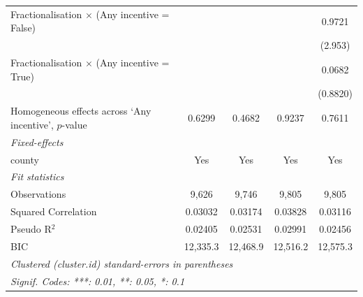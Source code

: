\documentclass[
]{article}
\begin{document}
\begin{landscape}
\begin{table}
\begin{tabular}{lcccc}
   Fractionalisation $\times$ (Any incentive = False)                                       &          &          &                & 0.9721\\   
                                                                                            &          &          &                & (2.953)\\   
   Fractionalisation $\times$ (Any incentive = True)                                        &          &          &                & 0.0682\\   
                                                                                            &          &          &                & (0.8820)\\   
   Homogeneous effects across `Any incentive', $p$-value                                    & 0.6299   & 0.4682   & 0.9237         & 0.7611\\  
   \midrule
   \emph{Fixed-effects}\\
   county                                                                                   & Yes      & Yes      & Yes            & Yes\\  
   \midrule
   \emph{Fit statistics}\\
   Observations                                                                             & 9,626    & 9,746    & 9,805          & 9,805\\  
   Squared Correlation                                                                      & 0.03032  & 0.03174  & 0.03828        & 0.03116\\  
   Pseudo R$^2$                                                                             & 0.02405  & 0.02531  & 0.02991        & 0.02456\\  
   BIC                                                                                      & 12,335.3 & 12,468.9 & 12,516.2       & 12,575.3\\  
   \midrule \midrule
   \multicolumn{5}{l}{\emph{Clustered (cluster.id) standard-errors in parentheses}}\\
   \multicolumn{5}{l}{\emph{Signif. Codes: ***: 0.01, **: 0.05, *: 0.1}}\\
\end{tabular}
\par\endgroup


\end{table}

\end{landscape}
\end{document}
